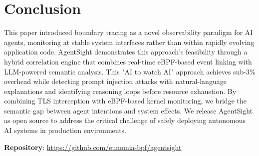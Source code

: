 
\section{Conclusion}

This paper introduced boundary tracing as a novel observability paradigm for AI agents, monitoring at stable system interfaces rather than within rapidly evolving application code. AgentSight demonstrates this approach's feasibility through a hybrid correlation engine that combines real-time eBPF-based event linking with LLM-powered semantic analysis. This "AI to watch AI" approach achieves sub-3\% overhead while detecting prompt injection attacks with natural-language explanations and identifying reasoning loops before resource exhaustion. By combining TLS interception with eBPF-based kernel monitoring, we bridge the semantic gap between agent intentions and system effects. We release AgentSight as open source to address the critical challenge of safely deploying autonomous AI systems in production environments.

\textbf{Repository}: \url{https://github.com/eunomia-bpf/agentsight}




